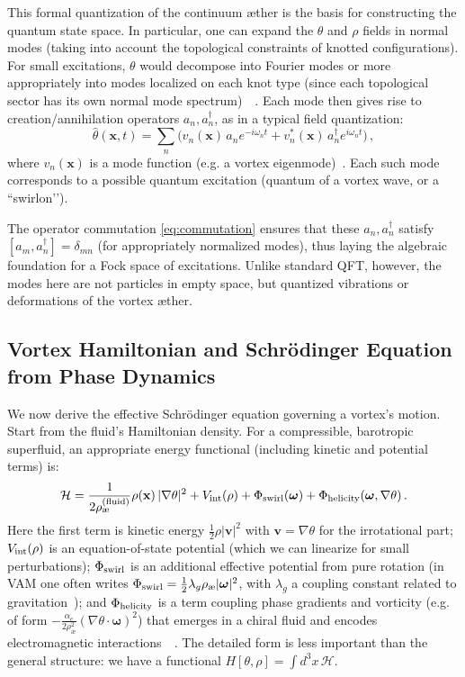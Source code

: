 \documentclass[preprint]{revtex4-2}
\begin{document}
    This formal quantization of the continuum æther is the basis for constructing the quantum state space. In particular, one can expand the $\theta$ and $\rho$ fields in normal modes (taking into account the topological constraints of knotted configurations). For small excitations, $\theta$ would decompose into Fourier modes or more appropriately into modes localized on each knot type (since each topological sector has its own normal mode spectrum)~\cite{reference_59}~\cite{reference_60}. Each mode then gives rise to creation/annihilation operators $a_n, a_n^\dagger$, as in a typical field quantization:
    \[
        \hat{\theta}(\mathbf{x},t) = \sum_n \big( v_n(\mathbf{x})\,a_n e^{-i\omega_n t} + v_n^*(\mathbf{x})\,a_n^\dagger e^{i\omega_n t}\big)\,,
    \]
    where $v_n(\mathbf{x})$ is a mode function (e.g. a vortex eigenmode)~\cite{reference_61}. Each such mode corresponds to a possible quantum excitation (quantum of a vortex wave, or a ``swirlon’’).

    The operator commutation \eqref{eq:commutation} ensures that these $a_n, a_n^\dagger$ satisfy $[a_m, a_n^\dagger] = \delta_{mn}$ (for appropriately normalized modes), thus laying the algebraic foundation for a Fock space of excitations. Unlike standard QFT, however, the modes here are not particles in empty space, but quantized vibrations or deformations of the vortex æther.

    \subsection{Vortex Hamiltonian and Schrödinger Equation from Phase Dynamics}
    We now derive the effective Schrödinger equation governing a vortex’s motion. Start from the fluid’s Hamiltonian density. For a compressible, barotropic superfluid, an appropriate energy functional (including kinetic and potential terms) is:
    \begin{equation}
        \mathcal{H} = \frac{1}{2\rho_{\text{\ae}}^{(\text{fluid})}} \rho(\mathbf{x})\,|\nabla \theta|^2 + V_{\rm int}(\rho) + \Phi_{\rm swirl}(\boldsymbol{\omega}) + \Phi_{\rm helicity}(\boldsymbol{\omega}, \nabla \theta)\,.
        \label{eq:Hamiltonian-density}
    \end{equation}
    Here the first term is kinetic energy $\frac{1}{2} \rho |\mathbf{v}|^2$ with $\mathbf{v}=\nabla \theta$ for the irrotational part; $V_{\rm int}(\rho)$ is an equation-of-state potential (which we can linearize for small perturbations); $\Phi_{\rm swirl}$ is an additional effective potential from pure rotation (in VAM one often writes $\Phi_{\rm swirl} = \frac{1}{2}\lambda_g \rho_{\text{\ae}} |\boldsymbol{\omega}|^2$, with $\lambda_g$ a coupling constant related to gravitation~\cite{reference_62}); and $\Phi_{\rm helicity}$ is a term coupling phase gradients and vorticity (e.g. of form $-\frac{\alpha_e}{2\rho_{\text{\ae}}^2}(\nabla \theta \cdot \boldsymbol{\omega})^2$) that emerges in a chiral fluid and encodes electromagnetic interactions~\cite{reference_63}~\cite{reference_64}. The detailed form is less important than the general structure: we have a functional $H[\theta, \rho] = \int d^3x\, \mathcal{H}$.
\end{document}
